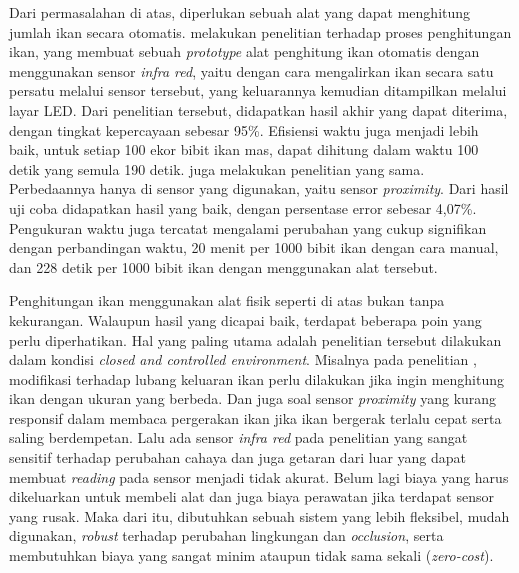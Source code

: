     Dari permasalahan di atas, diperlukan sebuah alat yang dapat menghitung jumlah ikan secara otomatis. \cite{Affandy2016} melakukan penelitian terhadap proses penghitungan ikan, yang membuat sebuah \emph{prototype} alat penghitung ikan otomatis dengan menggunakan sensor \emph{infra red}, yaitu dengan cara mengalirkan ikan secara satu persatu melalui sensor tersebut, yang keluarannya kemudian ditampilkan melalui layar LED. Dari penelitian tersebut, didapatkan hasil akhir yang dapat diterima, dengan tingkat kepercayaan sebesar 95\%. Efisiensi waktu juga menjadi lebih baik, untuk setiap 100 ekor bibit ikan mas, dapat dihitung dalam waktu 100 detik yang semula 190 detik. \citet{AlAmri2020} juga melakukan penelitian yang sama. Perbedaannya hanya di sensor yang digunakan, yaitu sensor \emph{proximity}. Dari hasil uji coba didapatkan hasil yang baik, dengan persentase error sebesar 4,07\%. Pengukuran waktu juga tercatat mengalami perubahan yang cukup signifikan dengan perbandingan waktu, 20 menit per 1000 bibit ikan dengan cara manual, dan 228 detik per 1000 bibit ikan dengan menggunakan alat tersebut.
    
    Penghitungan ikan menggunakan alat fisik seperti di atas bukan tanpa kekurangan. Walaupun hasil yang dicapai baik, terdapat beberapa poin yang perlu diperhatikan. Hal yang paling utama adalah penelitian tersebut dilakukan dalam kondisi \emph{closed and controlled environment}. Misalnya pada penelitian \citet{AlAmri2020}, modifikasi terhadap lubang keluaran ikan perlu dilakukan jika ingin menghitung ikan dengan ukuran yang berbeda. Dan juga soal sensor \emph{proximity} yang kurang responsif dalam membaca pergerakan ikan jika ikan bergerak terlalu cepat serta saling berdempetan. Lalu ada sensor \emph{infra red} pada penelitian \citet{Affandy2016} yang sangat sensitif terhadap perubahan cahaya dan juga getaran dari luar yang dapat membuat \emph{reading} pada sensor menjadi tidak akurat. Belum lagi biaya yang harus dikeluarkan untuk membeli alat dan juga biaya perawatan jika terdapat sensor yang rusak. Maka dari itu, dibutuhkan sebuah sistem yang lebih fleksibel, mudah digunakan, \emph{robust} terhadap perubahan lingkungan dan \emph{occlusion}, serta membutuhkan biaya yang sangat minim ataupun tidak sama sekali (\emph{zero-cost}).
    
